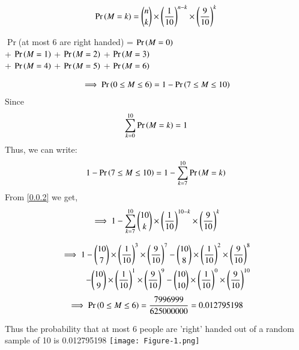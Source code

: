 \documentclass[journal,12pt,twocolumn]{IEEEtran}
\begin{document}
\begin{align}
\Pr\left(M=k\right) = {{n}\choose{k}} \times \left(\frac{1}{10}\right)^{n-k} \times \left(\frac{9}{10}\right)^{k}\label{0.0.2}
\end{align}
\begin{center}
$\Pr$(at most 6 are right handed) = $\Pr\left(M = 0\right)$\\+ $\Pr\left(M = 1\right)$ + $\Pr\left(M = 2\right)$ + $\Pr\left(M = 3\right)$ \\+ $\Pr\left(M = 4\right)$ + $\Pr\left(M = 5\right)$ + $\Pr\left(M = 6\right)$\\ 
\end{center}
\begin{align}
\implies \Pr\left(0\leq M \leq 6\right) = 1 - \Pr\left(7 \leq M \leq10\right)\label{0.0.3}
\end{align}
Since
\begin{align}
\sum_{k=0}^{10} \Pr\left(M=k\right) = 1\label{0.0.4}
\end{align}
\bigskip
Thus, we can write:
\begin{align}
1 - \Pr\left(7 \leq M \leq 10\right) = 1 - \sum_{k=7}^{10} \Pr\left(M=k\right)\label{0.0.5}
\end{align}
From \eqref{0.0.2} we get,
\begin{align}
\implies 1 - \sum_{k=7}^{10} {{10}\choose{k}} \times \left(\frac{1}{10}\right)^{10-k} \times \left(\frac{9}{10}\right)^{k}\label{0.0.6}
\end{align}

\begin{align}
\begin{split}
\implies 1 - {{10}\choose{7}} \times \brak{\frac{1}{10}}^{3} \times \brak{\frac{9}{10}}^{7} - {{10}\choose{8}} \times \brak{\frac{1}{10}}^{2} \times \brak{\frac{9}{10}}^{8}
\bigskip\\
-{{10}\choose{9}} \times \brak{\frac{1}{10}}^{1} \times \brak{\frac{9}{10}}^{9} - {{10}\choose{10}} \times \brak{\frac{1}{10}}^{0}\times
\brak{\frac{9}{10}}^{10}\label{0.0.7}
\end{split}
\end{align}
\begin{align}
\implies \Pr\left(0 \leq M \leq 6\right) = \frac{7996999}{625000000} = 0.012795198\notag
\end{align}

\bigskip
Thus the probability that at most 6 people are 'right' handed out of a random sample of 10 is 0.012795198 
\pagebreak
\texttt{[image: Figure-1.png]}
\end{document}
